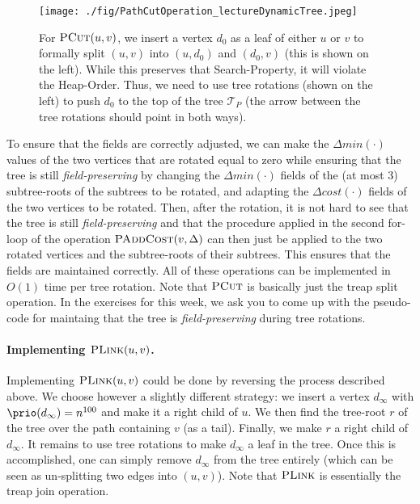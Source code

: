 \begin{figure}[!ht]
    \centering
    \texttt{[image: ./fig/PathCutOperation\_lectureDynamicTree.jpeg]}
    \caption{For $\textsc{PCut}(u,v)$, we insert a vertex $d_0$ as a leaf of either $u$ or $v$ to formally split $(u,v)$ into $(u,d_0)$ and $(d_0,v)$ (this is shown on the left). While this preserves that Search-Property, it will violate the Heap-Order. Thus, we need to use tree rotations (shown on the left) to push $d_0$ to the top of the tree $\mathcal{T}_{P}$ (the arrow between the tree rotations should point in both ways).}
    \label{fig:PCutRotation}
\end{figure}

To ensure that the fields are correctly adjusted, we can make the $\Delta min(\cdot)$ values of the two vertices that are rotated equal to zero while ensuring that the tree is still \emph{field-preserving} by changing the $\Delta min(\cdot)$ fields of the (at most 3) subtree-roots of the subtrees to be rotated, and adapting the $\Delta cost(\cdot)$ fields of the two vertices to be rotated. Then, after the rotation, it is not hard to see that the tree is still \emph{field-preserving} and that the procedure applied in the second for-loop of the operation $\textsc{PAddCost}(v, \Delta)$ can then just be applied to the two rotated vertices and the subtree-roots of their subtrees. This ensures that the fields are maintained correctly. All of these operations can be implemented in $O(1)$ time per tree rotation.
Note that  $\textsc{PCut}$ is basically just the treap split operation.
In the exercises for this week, we ask you to come up with the pseudo-code for maintaing that the tree is \emph{field-preserving} during tree rotations.

\paragraph{Implementing $\textsc{PLink}(u,v)$.} Implementing $\textsc{PLink}(u,v)$ could be done by reversing the process described above. We choose however a slightly different strategy: we insert a vertex $d_{\infty}$ with $\prio(d_{\infty}) = n^{100}$ and make it a right child of $u$. We then find the tree-root $r$ of the tree over the path containing $v$ (as a tail). Finally, we make $r$ a right child of $d_{\infty}$. It remains to use tree rotations to make $d_{\infty}$ a leaf in the tree.  Once this is accomplished, one can simply remove $d_{\infty}$ from the tree entirely (which can be seen as un-splitting two edges into $(u,v)$).
Note that  $\textsc{PLink}$ is essentially the treap join operation.

